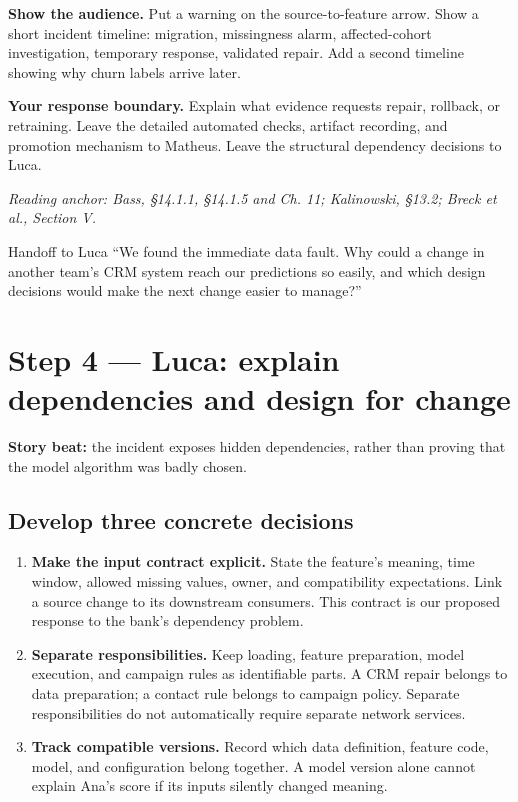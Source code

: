 \documentclass[12pt,a4paper]{article}
\newcommand{\source}[1]{\par\textcolor{teal!70!black}{\textit{Reading anchor: #1}}\par}
\begin{document}
\textbf{Show the audience.} Put a warning on the source-to-feature arrow. Show a short incident timeline: migration, missingness alarm, affected-cohort investigation, temporary response, validated repair. Add a second timeline showing why churn labels arrive later.

\textbf{Your response boundary.} Explain what evidence requests repair, rollback, or retraining. Leave the detailed automated checks, artifact recording, and promotion mechanism to Matheus. Leave the structural dependency decisions to Luca.

\source{Bass, \S14.1.1, \S14.1.5 and Ch. 11; Kalinowski, \S13.2; Breck et al., Section V.}

\begin{handoffbox}{Handoff to Luca}
``We found the immediate data fault. Why could a change in another team's CRM system reach our predictions so easily, and which design decisions would make the next change easier to manage?''
\end{handoffbox}

\section{Step 4 --- Luca: explain dependencies and design for change}
\textbf{Story beat:} the incident exposes hidden dependencies, rather than proving that the model algorithm was badly chosen.

\subsection{Develop three concrete decisions}
\begin{enumerate}
\item \textbf{Make the input contract explicit.} State the feature's meaning, time window, allowed missing values, owner, and compatibility expectations. Link a source change to its downstream consumers. This contract is our proposed response to the bank's dependency problem.
\item \textbf{Separate responsibilities.} Keep loading, feature preparation, model execution, and campaign rules as identifiable parts. A CRM repair belongs to data preparation; a contact rule belongs to campaign policy. Separate responsibilities do not automatically require separate network services.
\item \textbf{Track compatible versions.} Record which data definition, feature code, model, and configuration belong together. A model version alone cannot explain Ana's score if its inputs silently changed meaning.
\end{enumerate}
\end{document}
